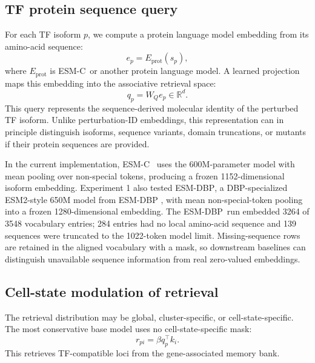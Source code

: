 \documentclass[11pt]{article}
\newcommand{\esm}{\textsc{ESM-C}}
\newcommand{\esmdbp}{\textsc{ESM-DBP}}
\begin{document}
\subsection{TF protein sequence query}

For each TF isoform \(p\), we compute a protein language model embedding from its amino-acid sequence:
\begin{equation}
    e_p = E_{\mathrm{prot}}(s_p),
\end{equation}
where \(E_{\mathrm{prot}}\) is \esm\ or another protein language model. A learned projection maps this embedding into the associative retrieval space:
\begin{equation}
    q_p = W_Q e_p \in \mathbb{R}^{d}.
\end{equation}
This query represents the sequence-derived molecular identity of the perturbed TF isoform. Unlike perturbation-ID embeddings, this representation can in principle distinguish isoforms, sequence variants, domain truncations, or mutants if their protein sequences are provided.

In the current implementation, \esm\ \citep{evolutionaryscale2024} uses the 600M-parameter model with mean pooling over non-special tokens, producing a frozen 1152-dimensional isoform embedding. Experiment 1 also tested \esmdbp, a DBP-specialized ESM2-style 650M model from ESM-DBP \citep{zeng2024esmdbp}, with mean non-special-token pooling into a frozen 1280-dimensional embedding. The \esmdbp\ run embedded 3264 of 3548 vocabulary entries; 284 entries had no local amino-acid sequence and 139 sequences were truncated to the 1022-token model limit. Missing-sequence rows are retained in the aligned vocabulary with a mask, so downstream baselines can distinguish unavailable sequence information from real zero-valued embeddings.

\subsection{Cell-state modulation of retrieval}

The retrieval distribution may be global, cluster-specific, or cell-state-specific. The most conservative base model uses no cell-state-specific mask:
\begin{equation}
    r_{pi} = \beta q_p^\top k_i.
\end{equation}
This retrieves TF-compatible loci from the gene-associated memory bank.
\end{document}
